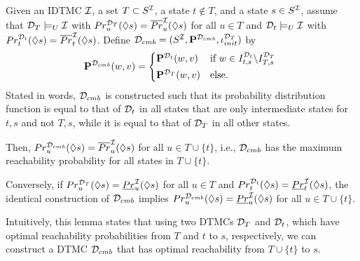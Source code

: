 \begin{lemma}\label{lem:one-state_extension}
    Given an IDTMC $\mathcal{I}$, a set $T \subset S^{\mathcal{I}}$, a state $t \notin T$, and a state $s\in S^{\mathcal{I}}$, assume that $\mathcal{D}_T \models_U \mathcal{I}$ with $Pr_u^{\mathcal{D}_T}(\lozenge s) = \overline{Pr}_u^{\mathcal{I}}(\lozenge s)$ for all $u\in T$ and $\mathcal{D}_t \models_U \mathcal{I}$ with $Pr_t^{\mathcal{D}_t}(\lozenge s) = \overline{Pr}_t^{\mathcal{I}}(\lozenge s)$. Define $\mathcal{D}_{cmb} = (S^{\mathcal{I}},\mathbf{P}^{\mathcal{D}_{cmb}},\iota_{init}^{\mathcal{D}_T})$ by
    \[\PF^{\MC_{cmb}}(w,v) = 
    \begin{cases*}
        \PF^{\MC_t}(w,v) & if $w\in I^{\MC_t}_{t,s}\backslash I^{\MC_T}_{T,s}$ \\
        \PF^{\MC_T}(w,v) & else.
    \end{cases*}\]
    Stated in words, $\mathcal{D}_{cmb}$ is constructed such that its probability distribution function is equal to that of $\mathcal{D}_t$ in all states that are only intermediate states for $t,s$ and not $T,s$, while it is equal to that of $\mathcal{D}_T$ in all other states.
    
    Then, $Pr^{\mathcal{D}_{cmb}}_u(\lozenge s) = \overline{Pr}^{\mathcal{I}}_{u}(\lozenge s)$ for all $u \in T \cup \{t\}$, i.e., $\mathcal{D}_{cmb}$ has the maximum reachability probability for all states in $T\cup \{t\}$.

    Conversely, if $Pr_u^{\mathcal{D}_T}(\lozenge s) = \underline{Pr}_u^{\mathcal{I}}(\lozenge s)$ for all $u\in T$ and $Pr_t^{\mathcal{D}_t}(\lozenge s) = \underline{Pr}_t^{\mathcal{I}}(\lozenge s)$, the identical construction of $\mathcal{D}_{cmb}$ implies $Pr^{\mathcal{D}_{cmb}}_u(\lozenge s) = \underline{Pr}^{\mathcal{I}}_{u}(\lozenge s)$ for all $u \in T \cup \{t\}$.
\end{lemma}

Intuitively, this lemma states that using two DTMCs $\mathcal{D}_T$ and $\mathcal{D}_t$, which have optimal reachability probabilities from $T$ and $t$ to $s$, respectively, we can construct a DTMC $\mathcal{D}_{cmb}$ that has optimal reachability from $T\cup\{t\}$ to $s$.

